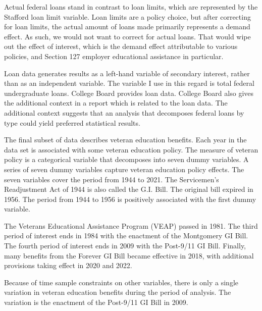 \documentclass[review]{elsarticle}
\begin{document}
Actual federal loans stand in contrast to loan limits, which are represented by the Stafford loan limit variable.
Loan limits are a policy choice, but after correcting for loan limits,
the actual amount of loans made primarily represents a demand effect.
As such, we would not want to correct for actual loans.
That would wipe out the effect of interest,
which is the demand effect attributable to various policies,
and Section 127 employer educational assistance in particular.

Loan data generates results as a left-hand variable of secondary interest, rather than as an independent variable.
The variable I use in this regard is total federal undergraduate loans.
College Board provides loan data.
College Board also gives the additional context in a report which is related to the loan data\cite{cb_excel_2019}.
The additional context suggests that an analysis that decomposes federal loans by type could yield preferred statistical results\cite{cb_trends_2019}.

The final subset of data describes veteran education benefits.
Each year in the data set is associated with some veteran education policy.
The measure of veteran policy is a categorical variable that decomposes into seven dummy variables.
A series of seven dummy variables capture veteran education policy effects.
The seven variables cover the period from 1944 to 2021.
The Servicemen's Readjustment Act of 1944 is also called the G.I. Bill.
The original bill expired in 1956\cite{glass_2010}.
The period from 1944 to 1956 is positively associated with the first dummy variable.

The Veterans Educational Assistance Program (VEAP) passed in 1981\cite{veteransaffairs_2017}.
The third period of interest ends in 1984 with the enactment of the Montgomery GI Bill\cite{powers_2018}.
The fourth period of interest ends in 2009 with the Post-9/11 GI Bill.
Finally, many benefits from the Forever GI Bill became effective in 2018,
with additional provisions taking effect in 2020 and 2022\cite{veteransaffairs_2020}.

Because of time sample constraints on other variables,
there is only a single variation in veteran education benefits during the period of analysis.
The variation is the enactment of the Post-9/11 GI Bill in 2009.
\end{document}

